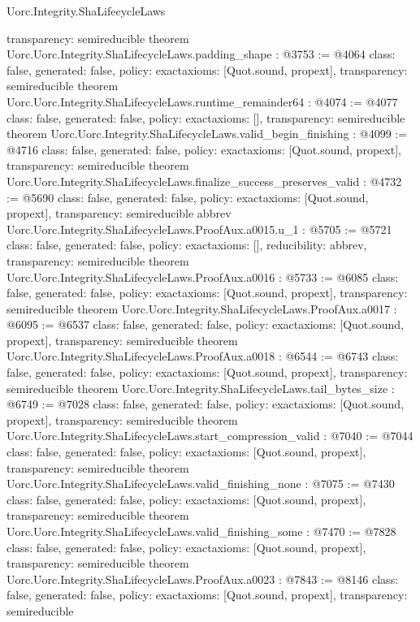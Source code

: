 \begin{lexlean}{Uorc.Integrity.ShaLifecycleLaws}
\begin{coremodule}
{  transparency: semireducible
}
theorem Uorc.Uorc.Integrity.ShaLifecycleLaws.padding_shape : @3753 := @4064 {
  class: false,
  generated: false,
  policy: exact{axioms: [Quot.sound, propext]},
  transparency: semireducible
}
theorem Uorc.Uorc.Integrity.ShaLifecycleLaws.runtime_remainder64 : @4074 := @4077 {
  class: false,
  generated: false,
  policy: exact{axioms: []},
  transparency: semireducible
}
theorem Uorc.Uorc.Integrity.ShaLifecycleLaws.valid_begin_finishing : @4099 := @4716 {
  class: false,
  generated: false,
  policy: exact{axioms: [Quot.sound, propext]},
  transparency: semireducible
}
theorem Uorc.Uorc.Integrity.ShaLifecycleLaws.finalize_success_preserves_valid : @4732 := @5690 {
  class: false,
  generated: false,
  policy: exact{axioms: [Quot.sound, propext]},
  transparency: semireducible
}
abbrev Uorc.Uorc.Integrity.ShaLifecycleLaws.ProofAux.a0015.{u_1} : @5705 := @5721 {
  class: false,
  generated: false,
  policy: exact{axioms: []},
  reducibility: abbrev{},
  transparency: semireducible
}
theorem Uorc.Uorc.Integrity.ShaLifecycleLaws.ProofAux.a0016 : @5733 := @6085 {
  class: false,
  generated: false,
  policy: exact{axioms: [Quot.sound, propext]},
  transparency: semireducible
}
theorem Uorc.Uorc.Integrity.ShaLifecycleLaws.ProofAux.a0017 : @6095 := @6537 {
  class: false,
  generated: false,
  policy: exact{axioms: [Quot.sound, propext]},
  transparency: semireducible
}
theorem Uorc.Uorc.Integrity.ShaLifecycleLaws.ProofAux.a0018 : @6544 := @6743 {
  class: false,
  generated: false,
  policy: exact{axioms: [Quot.sound, propext]},
  transparency: semireducible
}
theorem Uorc.Uorc.Integrity.ShaLifecycleLaws.tail_bytes_size : @6749 := @7028 {
  class: false,
  generated: false,
  policy: exact{axioms: [Quot.sound, propext]},
  transparency: semireducible
}
theorem Uorc.Uorc.Integrity.ShaLifecycleLaws.start_compression_valid : @7040 := @7044 {
  class: false,
  generated: false,
  policy: exact{axioms: [Quot.sound, propext]},
  transparency: semireducible
}
theorem Uorc.Uorc.Integrity.ShaLifecycleLaws.valid_finishing_none : @7075 := @7430 {
  class: false,
  generated: false,
  policy: exact{axioms: [Quot.sound, propext]},
  transparency: semireducible
}
theorem Uorc.Uorc.Integrity.ShaLifecycleLaws.valid_finishing_some : @7470 := @7828 {
  class: false,
  generated: false,
  policy: exact{axioms: [Quot.sound, propext]},
  transparency: semireducible
}
theorem Uorc.Uorc.Integrity.ShaLifecycleLaws.ProofAux.a0023 : @7843 := @8146 {
  class: false,
  generated: false,
  policy: exact{axioms: [Quot.sound, propext]},
  transparency: semireducible
}
\end{coremodule}
\end{lexlean}

